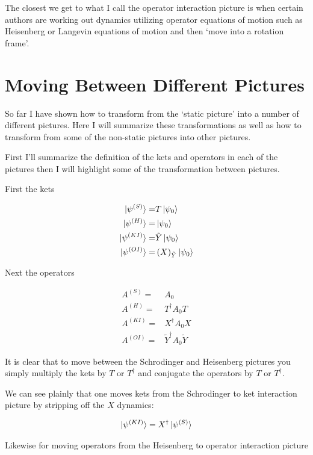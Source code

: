 \documentclass[12pt]{article}
\begin{document}
The closest we get to what I call the operator interaction picture is when certain authors are working out dynamics utilizing operator equations of motion such as Heisenberg or Langevin equations of motion and then `move into a rotation frame'. 

\section{Moving Between Different Pictures}

So far I have shown how to transform from the `static picture' into a number of different pictures. Here I will summarize these transformations as well as how to transform from some of the non-static pictures into other pictures.

First I'll summarize the definition of the kets and operators in each of the pictures then I will highlight some of the transformation between pictures.

First the kets

\begin{align}
\ket{\psi^{(S)}} =& T\ket{\psi_0} \nonumber\\
\ket{\psi^{(H)}} =& \ket{\psi_0} \nonumber\\
\ket{\psi^{(KI)}} =& \tilde{Y}\ket{\psi_0} \nonumber\\
\ket{\psi^{(OI)}} =& \left(X\right)_{\tilde{Y}} \ket{\psi_0}
\end{align}

Next the operators

\begin{align}
A^{(S)} =& A_0 \nonumber\\
A^{(H)} =& T^{\dag}A_0T \nonumber\\
A^{(KI)} =& X^{\dag}A_0X \nonumber\\
A^{(OI)} =& \tilde{Y}^{\dag}A_0\tilde{Y}
\end{align}

It is clear that to move between the Schrodinger and Heisenberg pictures you simply multiply the kets by $T$ or $T^{\dag}$ and conjugate the operators by $T$ or $T^{\dag}$.

We can see plainly that one moves kets from the Schrodinger to ket interaction picture by stripping off the $X$ dynamics:

\begin{align}
\ket{\psi^{(KI)}} = X^{\dag}\ket{\psi^{(S)}}
\end{align}

Likewise for moving operators from the Heisenberg to operator interaction picture
\end{document}
